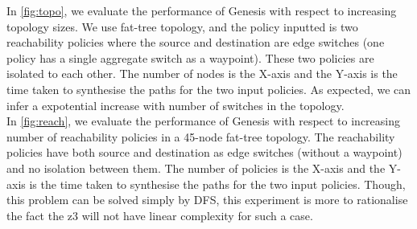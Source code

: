 \documentclass[]{sig}
\begin{document}
In \cref{fig:topo}, we evaluate the performance of Genesis with respect to increasing topology sizes. We use fat-tree topology, and the policy inputted is two reachability policies where the source and destination are edge switches (one policy has a single aggregate switch as a waypoint). These two policies are isolated to each other. The number of nodes is the X-axis and the Y-axis is the time taken to synthesise the paths for the two input policies. As expected, we can infer a expotential increase with number of switches in the topology. \\
In \cref{fig:reach}, we evaluate the performance of Genesis with respect to increasing number of reachability policies in a 45-node fat-tree topology. The reachability policies have both source and destination as edge switches (without a waypoint) and no isolation between them. The number of policies is the X-axis and the Y-axis is the time taken to synthesise the paths for the two input policies. Though, this problem can be solved simply by DFS, this experiment is more to rationalise the fact the z3 will not have linear complexity for such a case.
\end{document}
